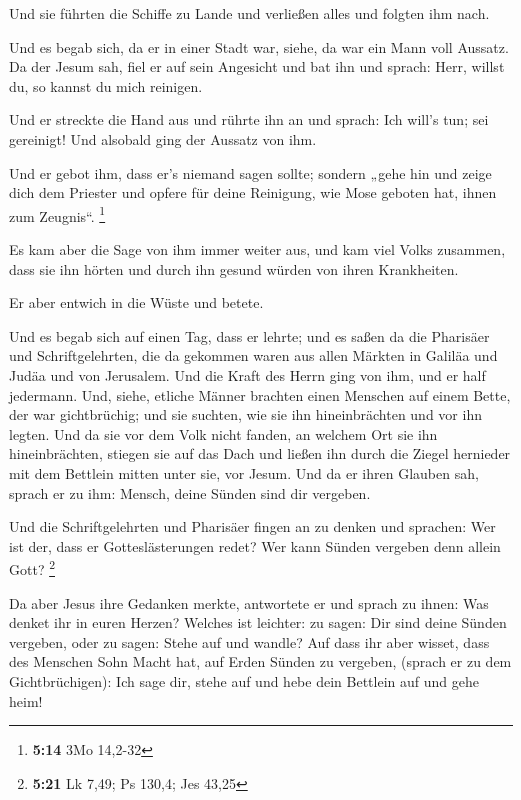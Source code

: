  Und sie führten die Schiffe zu Lande und verließen alles
und folgten ihm nach.

 Und es begab sich, da er in einer Stadt war, siehe, da
war ein Mann voll Aussatz. Da der Jesum sah, fiel er auf sein Angesicht
und bat ihn und sprach: Herr, willst du, so kannst du mich reinigen.

 Und er streckte die Hand aus und rührte ihn an und
sprach: Ich will's tun; sei gereinigt! Und alsobald ging der Aussatz von
ihm.

 Und er gebot ihm, dass er's niemand sagen sollte;
sondern „gehe hin und zeige dich dem Priester und opfere für deine
Reinigung, wie Mose geboten hat, ihnen zum Zeugnis``. \footnote{\textbf{5:14}
  3Mo 14,2-32}

 Es kam aber die Sage von ihm immer weiter aus, und kam
viel Volks zusammen, dass sie ihn hörten und durch ihn gesund würden von
ihren Krankheiten.

 Er aber entwich in die Wüste und betete.

 Und es begab sich auf einen Tag, dass er lehrte; und es
saßen da die Pharisäer und Schriftgelehrten, die da gekommen waren aus
allen Märkten in Galiläa und Judäa und von Jerusalem. Und die Kraft des
Herrn ging von ihm, und er half jedermann.  Und, siehe,
etliche Männer brachten einen Menschen auf einem Bette, der war
gichtbrüchig; und sie suchten, wie sie ihn hineinbrächten und vor ihn
legten.  Und da sie vor dem Volk nicht fanden, an welchem
Ort sie ihn hineinbrächten, stiegen sie auf das Dach und ließen ihn
durch die Ziegel hernieder mit dem Bettlein mitten unter sie, vor Jesum.
 Und da er ihren Glauben sah, sprach er zu ihm: Mensch,
deine Sünden sind dir vergeben.

 Und die Schriftgelehrten und Pharisäer fingen an zu
denken und sprachen: Wer ist der, dass er Gotteslästerungen redet? Wer
kann Sünden vergeben denn allein Gott? \footnote{\textbf{5:21} Lk 7,49;
  Ps 130,4; Jes 43,25}

 Da aber Jesus ihre Gedanken merkte, antwortete er und
sprach zu ihnen: Was denket ihr in euren Herzen?  Welches
ist leichter: zu sagen: Dir sind deine Sünden vergeben, oder zu sagen:
Stehe auf und wandle?  Auf dass ihr aber wisset, dass des
Menschen Sohn Macht hat, auf Erden Sünden zu vergeben, (sprach er zu dem
Gichtbrüchigen): Ich sage dir, stehe auf und hebe dein Bettlein auf und
gehe heim!

